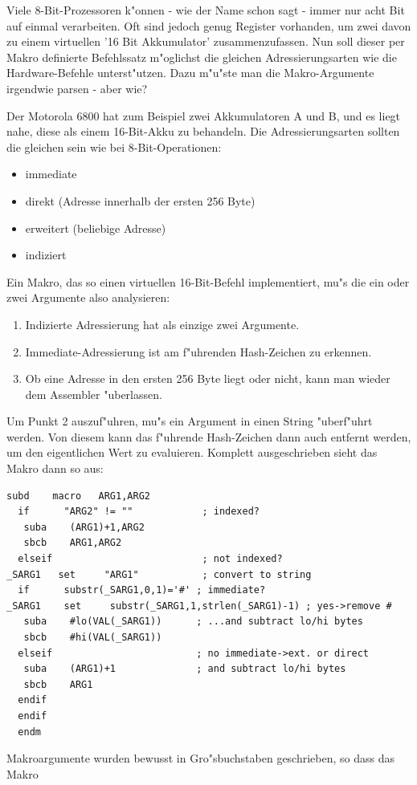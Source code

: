 \documentclass[12pt,a4paper,twoside]{report}
\begin{document}
Viele 8-Bit-Prozessoren k"onnen - wie der Name schon sagt - immer nur acht Bit
auf einmal verarbeiten.  Oft sind jedoch genug Register vorhanden, um zwei
davon zu einem virtuellen '16 Bit Akkumulator' zusammenzufassen.  Nun soll dieser
per Makro definierte Befehlssatz m"oglichst die gleichen Adressierungsarten
wie die Hardware-Befehle unterst"utzen.  Dazu m"u"ste man die Makro-Argumente
irgendwie parsen - aber wie?

Der Motorola 6800 hat zum Beispiel zwei Akkumulatoren A und B, und es liegt
nahe, diese als einem 16-Bit-Akku zu behandeln.  Die Adressierungsarten
sollten die gleichen sein wie bei 8-Bit-Operationen:
\begin{itemize}
\item{immediate}
\item{direkt (Adresse innerhalb der ersten 256 Byte)}
\item{erweitert (beliebige Adresse)}
\item{indiziert}
\end{itemize}
Ein Makro, das so einen virtuellen 16-Bit-Befehl implementiert, mu"s die ein oder
zwei Argumente also analysieren:
\begin{enumerate}
\item{Indizierte Adressierung hat als einzige zwei Argumente.}
\item{Immediate-Adressierung ist am f"uhrenden Hash-Zeichen zu erkennen.}
\item{Ob eine Adresse in den ersten 256 Byte liegt oder nicht, kann man
      wieder dem Assembler "uberlassen.}
\end{enumerate}
Um Punkt 2 auszuf"uhren, mu"s ein Argument in einen String "uberf"uhrt werden.  Von
diesem kann das f"uhrende Hash-Zeichen dann auch entfernt werden, um den eigentlichen
Wert zu evaluieren.  Komplett ausgeschrieben sieht das Makro dann so aus:
\begin{verbatim}
subd    macro   ARG1,ARG2
  if      "ARG2" != ""            ; indexed?
   suba    (ARG1)+1,ARG2
   sbcb    ARG1,ARG2
  elseif                          ; not indexed?
_SARG1   set     "ARG1"           ; convert to string
  if      substr(_SARG1,0,1)='#' ; immediate?
_SARG1    set     substr(_SARG1,1,strlen(_SARG1)-1) ; yes->remove #
   suba    #lo(VAL(_SARG1))      ; ...and subtract lo/hi bytes
   sbcb    #hi(VAL(_SARG1))
  elseif                         ; no immediate->ext. or direct
   suba    (ARG1)+1              ; and subtract lo/hi bytes
   sbcb    ARG1
  endif
  endif
  endm
\end{verbatim}
Makroargumente wurden bewusst in Gro"sbuchstaben geschrieben, so dass das Makro
\end{document}
